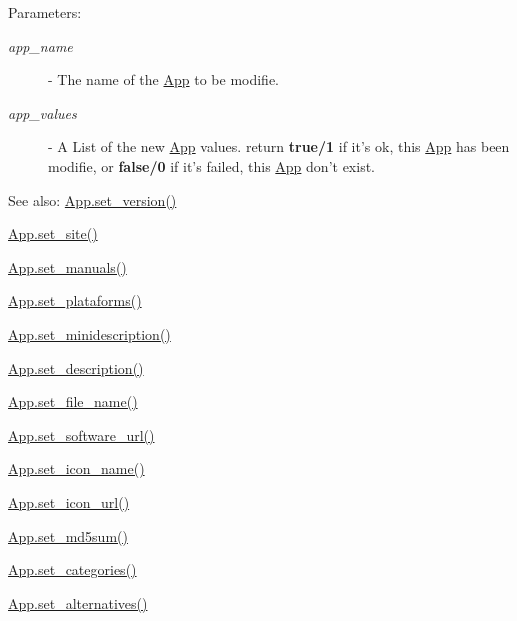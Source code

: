 \begin{Desc}
\item[Parameters:]
\begin{description}
\item[{\em app\_\-name}]- The name of the \hyperlink{classwinsollib_1_1App}{App} to be modifie. \item[{\em app\_\-values}]- A List of the new \hyperlink{classwinsollib_1_1App}{App} values. return {\bf true/1} if it's ok, this \hyperlink{classwinsollib_1_1App}{App} has been modifie, or {\bf false/0} if it's failed, this \hyperlink{classwinsollib_1_1App}{App} don't exist.\end{description}
\end{Desc}
\begin{Desc}
\item[See also:]\hyperlink{classwinsollib_1_1App_4f59b1de4fdea104fe2e6143dd73596e}{App.set\_\-version()} 

\hyperlink{classwinsollib_1_1App_11788074387939e13d01d0574dccdef6}{App.set\_\-site()} 

\hyperlink{classwinsollib_1_1App_6784e178b869d2637ca9901245bf5e66}{App.set\_\-manuals()} 

\hyperlink{classwinsollib_1_1App_8420ea0b005195177bf4f62dbbaa749f}{App.set\_\-plataforms()} 

\hyperlink{classwinsollib_1_1App_7187322bf1593b14b2bb60fac8ed07fe}{App.set\_\-minidescription()} 

\hyperlink{classwinsollib_1_1App_b6ff31455b7695f3798c22fc4c457049}{App.set\_\-description()} 

\hyperlink{classwinsollib_1_1App_ff314b21ddd0858fb855e6f841d4205d}{App.set\_\-file\_\-name()} 

\hyperlink{classwinsollib_1_1App_598bc6c69cd3a5f4edeba566ddfda333}{App.set\_\-software\_\-url()} 

\hyperlink{classwinsollib_1_1App_9a64e8cece58eca7dacf29f213757f1b}{App.set\_\-icon\_\-name()} 

\hyperlink{classwinsollib_1_1App_6e2e332bc002d98936b5e3d94a45da5a}{App.set\_\-icon\_\-url()} 

\hyperlink{classwinsollib_1_1App_212c0f8cd2f5941d3fbb9e3cb31ae019}{App.set\_\-md5sum()} 

\hyperlink{classwinsollib_1_1App_53671291ce40f5ed9d125dec57f70902}{App.set\_\-categories()} 

\hyperlink{classwinsollib_1_1App_3d96046f852fa25380c7ac50b115ff39}{App.set\_\-alternatives()} \end{Desc}


